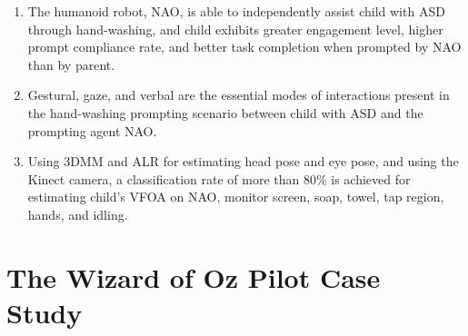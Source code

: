 \documentclass{ut-thesis}
\begin{document}
\begin{enumerate}
	\item The humanoid robot, NAO, is able to independently assist child with ASD through hand-washing, and child exhibits greater engagement level, higher prompt compliance rate, and better task completion when prompted by NAO than by parent.

	\item Gestural, gaze, and verbal are the essential modes of interactions present in the hand-washing prompting scenario between child with ASD and the prompting agent NAO.

	\item Using 3DMM and ALR for estimating head pose and eye pose, and using the Kinect camera, a classification rate of more than 80\% is achieved for estimating child's VFOA on NAO, monitor screen, soap, towel, tap region, hands, and idling.

\end{enumerate}

\chapter{The Wizard of Oz Pilot Case Study}



\end{document}
